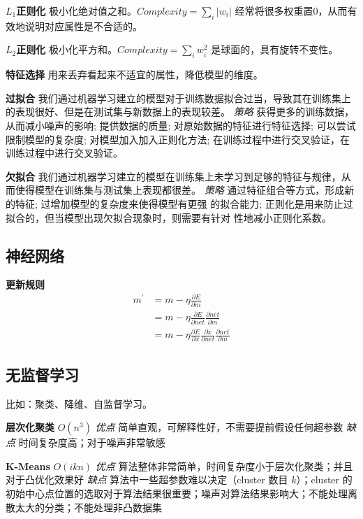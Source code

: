 \documentclass[10pt,a4paper]{ctexart}
\begin{document}
\begin{multicols}{3}
        $L_1$\textbf{正则化}
        极小化绝对值之和。$\mathit{Complexity}=\sum_i |w_i|$ 经常将很多权重置0，从而有效地说明对应属性是不合适的。

        $L_2$\textbf{正则化}
        极小化平方和。$\mathit{Complexity}=\sum_i w_i^2$ 是球面的，具有旋转不变性。

        \textbf{特征选择}
        用来丢弃看起来不适宜的属性，降低模型的维度。

        \textbf{过拟合}
        我们通过机器学习建立的模型对于训练数据拟合过当，导致其在训练集上的表现很好、但是在测试集与新数据上的表现较差。
        \emph{策略}
        获得更多的训练数据，从而减小噪声的影响; 提供数据的质量; 对原始数据的特征进行特征选择; 可以尝试限制模型的复杂度; 对模型加入加入正则化方法; 在训练过程中进行交叉验证，在训练过程中进行交叉验证。

        \textbf{欠拟合}
        我们通过机器学习建立的模型在训练集上未学习到足够的特征与规律，从而使得模型在训练集与测试集上表现都很差。
        \emph{策略}
        通过特征组合等方式，形成新的特征; 过增加模型的复杂度来使得模型有更强
        的拟合能力; 正则化是用来防止过拟合的，但当模型出现欠拟合现象时，则需要有针对
        性地减小正则化系数。       
        
        \subsection{神经网络}
        \textbf{更新规则}
        \begin{align*}
            m^\prime &= m - \eta \frac{\partial E}{\partial m}\\
                    &= m - \eta \frac{\partial E}{\partial net}\frac{\partial net}{\partial m}\\
                    &= m - \eta \frac{\partial E}{\partial x}\frac{\partial x}{\partial net}\frac{\partial net}{\partial m}
        \end{align*}

        \subsection{无监督学习}
        比如：聚类、降维、自监督学习。

        \textbf{层次化聚类} $O(n^3)$ \emph{优点} 
        简单直观，可解释性好，不需要提前假设任何超参数
        \emph{缺点}
        时间复杂度高；对于噪声非常敏感

        \textbf{K-Means} $O(ikn)$ \emph{优点}
        算法整体非常简单，时间复杂度小于层次化聚类；并且对于凸优化效果好
        \emph{缺点}
        算法中一些超参数难以决定（cluster 数目 $k$）；cluster 的初始中心点位置的选取对于算法结果很重要；噪声对算法结果影响大；不能处理离散太大的分类；不能处理非凸数据集


\end{multicols}
\end{document}
